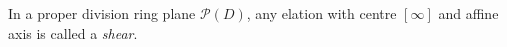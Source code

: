 In a proper division ring plane $\mathcal{P}(D)$, any elation with centre $[\infty]$ and affine axis is called a {\em shear}.
